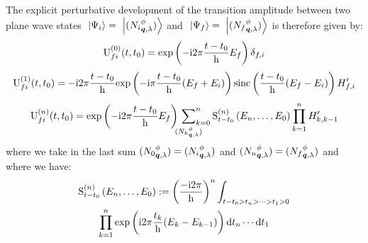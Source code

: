 \documentclass[10pt,a4paper,twoside,openany]{book}
\begin{document}
The explicit perturbative development of the transition amplitude between two plane wave states $\ket{\Psi_i} = \ket{\bFQ {N_i} \pt \q \sp}$ and $\ket{\Psi_f} = \ket{\bFQ {N_f} \pt \q \sp}$ is therefore given by:
\begin{equation*}
\Umn f i 0 t {t_0} = \exp{-\i 2 \pi \frac{t - t_0} \h E_f} \delta_{f,i}
\end{equation*}
\begin{equation*}
\Umn f i 1 t {t_0} = -\i 2 \pi \frac{t - t_0} \h \exp{-\i \pi \frac{t - t_0} \h ( E_f + E_i )} \sinc{\frac{t - t_0} \h ( E_f - E_i )} H'_{f,i}
\end{equation*}
\begin{equation*}
\Umn f i n t {t_0} = \exp{-\i 2 \pi \frac{t - t_0} \h E_f} \sideset{}{_{k=0}^n}\sum_{\bFQ {N_k} \pt \q \sp} \SmE n {E_n, \dotsc, E_0} \prod_{k=1}^n H'_{k,k-1}
\end{equation*}
where we take in the last sum $\bFQ {N_0} \pt \q \sp = \bFQ {N_i} \pt \q \sp$ and $\bFQ {N_n} \pt \q \sp = \bFQ {N_f} \pt \q \sp$ and where we have:
\begin{multline*}
\SmE n {E_n, \dotsc, E_0} \eqdef \left( \frac{-\i 2 \pi} \h \right)^n \int_{t - t_0 > t_n > \dotsb > t_1 > 0} \\
\prod_{k=1}^n \exp{\i 2 \pi \frac{t_k} \h ( E_k - E_{k - 1} )} \dt_n \dotsm \dt_1
\end{multline*}
\end{document}
